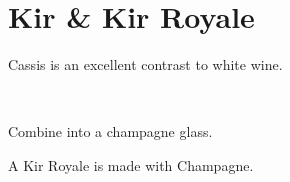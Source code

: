 \section[Kir]{Kir \& Kir Royale}


\begin{recipestats}[
	servings=1,
	preptime=5~\minute,
	original=\citeauthor{kirIBA}~\cite{kirIBA},
]
\end{recipestats}


\begin{recipeabstract}
	Cassis is an excellent contrast to white wine.
\end{recipeabstract}


\begin{ingredientcolumns}[1]
	\begin{ingredientblock}
		\\
	\end{ingredientblock}
\end{ingredientcolumns}


\begin{preparation}
	\item Combine into a champagne glass.
\end{preparation}

\begin{variation}
	\item A Kir Royale is made with Champagne.
\end{variation}

\recipeend%

